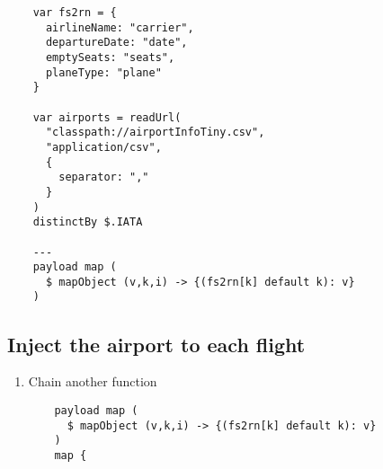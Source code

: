 \begin{enumerate}[resume*]
\begin{lstlisting}
    var fs2rn = {
      airlineName: "carrier",
      departureDate: "date",
      emptySeats: "seats",
      planeType: "plane"
    }

    var airports = readUrl(
      "classpath://airportInfoTiny.csv",
      "application/csv",
      {
        separator: ","
      }
    )
    distinctBy $.IATA

    ---
    payload map (
      $ mapObject (v,k,i) -> {(fs2rn[k] default k): v}
    )
  \end{lstlisting}
\end{enumerate}

\subsection{Inject the airport to each flight}
\begin{enumerate}[resume*]
\item Chain another  function
  \begin{lstlisting}
    payload map (
      $ mapObject (v,k,i) -> {(fs2rn[k] default k): v}
    )
    map {
      

\end{lstlisting}
\end{enumerate}
